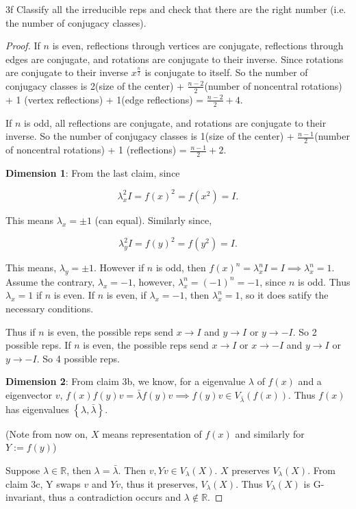 \documentclass{article}
\newcommand{\R}{\mathbb{R}}
\begin{document}
\begin{claim}{3f}\label{Claim 3f.}
    Classify all the irreducible reps and check that there are the right number (i.e. the number of conjugacy classes).
\end{claim}
\begin{proof}
    If $n$ is even, reflections through vertices are conjugate, reflections through edges are conjugate, and rotations are conjugate to their inverse. Since rotations are conjugate to their inverse $x^{\frac{n}{2}}$ is conjugate to itself. So the number of conjugacy classes is 2(size of the center) + $\frac{n - 2}{2}$(number of noncentral rotations) + 1 (vertex reflections) + 1(edge reflections) = $\frac{n - 2}{2} + 4$.
    
    If $n$ is odd, all reflections are conjugate, and rotations are conjugate to their inverse. So the number of conjugacy classes is 1(size of the center) + $\frac{n - 1}{2}$(number of noncentral rotations) + 1 (reflections) = $\frac{n - 1}{2} + 2$. 

    \textbf{Dimension 1}: From the last claim, since 
    
    \[\lambda_x^2 I = f(x)^2 = f(x^2) = I.\]

    This means $\lambda_x = \pm 1$ (can equal). Similarly since, 
    
    \[\lambda_y^2 I = f(y)^2 = f(y^2) = I.\]

    This means, $\lambda_y = \pm 1$. However if $n$ is odd, then $f(x)^n = \lambda_x^n I = I  \implies \lambda_x^n = 1$. Assume the contrary, $\lambda_x = -1$, however, $\lambda_x^n = (-1)^n = -1$, since $n$ is odd. Thus $\lambda_x = 1$ if $n$ is even. If $n$ is even, if $\lambda_x = -1$, then $\lambda_x^n = 1$, so it does satify the necessary conditions. 
    
    Thus if $n$ is even, the possible reps send $x \to I$ and $y \to I$ or $y \to -I$. So 2 possible reps. If $n$ is even, the possible reps send $x \to I$ or $x \to -I$ and $y \to I$ or $y \to -I$. So 4 possible reps.
    
    \textbf{Dimension 2}: From claim 3b, we know, for a eigenvalue $\lambda$ of $f(x)$ and a eigenvector $v$, $f(x)f(y)v = \bar{\lambda} f(y)v \implies f(y)v \in V_{\bar{\lambda}}(f(x))$. Thus $f(x)$ has eigenvalues $\left\{ \lambda, \bar{\lambda} \right\}$.
    
    (Note from now on, $X$ means representation of $f(x)$ and similarly for $Y := f(y)$)

    Suppose $\lambda \in \R$, then $\lambda = \bar{\lambda}$. Then $v, Yv \in V_\lambda(X)$. $X$ preserves $V_\lambda(X)$. From claim 3c, Y swaps $v$ and $Yv$, thus it preserves, $V_\lambda(X)$. Thus $V_\lambda(X)$ is G-invariant, thus a contradiction occurs and $\lambda \not \in \R$.
    

\end{proof}
\end{document}
